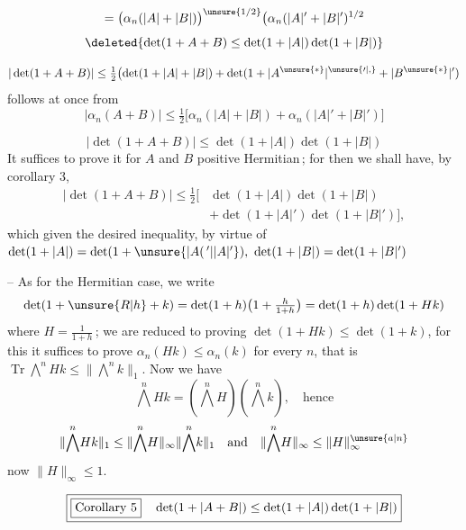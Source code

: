 \[
=\bigl(\alpha_n(|A|+|B|)\bigr)^{\unsure{1/2}}\bigl(\alpha_n(|A|'+|B|')^{1/2}
\]
\[
\deleted{\det(1+A+B)\leq\det(1+|A|)\det(1+|B|)}
\]

\[
|\det(1+A+B)|\leq\tfrac12\bigl(\det(1+|A|+|B|)+\det(1+|A^{\unsure{*}}|^{\unsure{\prime|,}}+|B^{\unsure{*}}|')
\]
follows at once from
\[
|\alpha_n(A+B)|\leq\tfrac12\bigl[\alpha_n(|A|+|B|)+\alpha_n(|A|'+|B|')\bigr]
\]

\[
\boxed{|\det(1+A+B)|\leq\det(1+|A|)\det(1+|B|)}
\]
It suffices to  prove it for $A$ and $B$
positive Hermitian\,; for then we shall have, by
corollary 3,
\[
\begin{aligned}
|\det(1+A+B)|\leq\tfrac12\bigl[&\det(1+|A|)\det(1+|B|)\\
&+\det(1+|A|')\det(1+|B|')\bigr],
\end{aligned}
\]
which given the desired inequality, by virtue of
$\det(1+|A|)=\det(1+\unsure{\lvert A(\,{}'|\lvert A\rvert'}),\ \det(1+|B|)=\det(1+|B|')$

-- As for the  Hermitian case, we write
\[
\det(1+\unsure{R|h}+k)=\det(1+h)\bigl(1+\tfrac{h}{1+h}\bigr)=\det(1+h)\det(1+Hk)
\]
where $H=\frac{1}{1+h}$\,; we are reduced to proving
$\det(1+Hk)\leq\det(1+k)$, for this it suffices
to prove $\alpha_n(Hk)\leq\alpha_n(k)$ for every $n$,
that is $\operatorname{Tr}\overset{n}{\bigwedge}Hk\leq\|\overset{n}{\bigwedge}k\|_1$. Now we have
\[
\overset{n}{\bigwedge}Hk=(\overset{n}{\bigwedge}H)(\overset{n}{\bigwedge}k),\quad\text{hence}
\]
\[
\|\overset{n}{\bigwedge}Hk\|_1\leq\|\overset{n}{\bigwedge}H\|_\infty\|\overset{n}{\bigwedge}k\|_1
\quad\text{and}\quad\|\overset{n}{\bigwedge}H\|_\infty\leq\|H\|_\infty^{\unsure{a|n}}
\]
\margin{!}now $\|H\|_\infty\leq1$.

\[
\boxed{\text{\fbox{Corollary 5}}\quad\det(1+|A+B|)\leq\det(1+|A|)\det(1+|B|)}
\]
